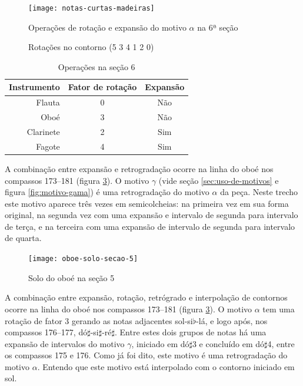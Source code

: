 \begin{figure}
  \centering
    \texttt{[image: notas-curtas-madeiras]}
    \caption{Operações de rotação e expansão do motivo $\alpha$ na 6ª
    seção}
  \label{fig:notas-curtas-madeiras}
\end{figure}

\begin{figure}
  \centering
  \subfloat[Rotação 2: (4 1 2 0 5 3)]{
    \texttt{[image: c-412053]}
    \label{fig:412053}  
  }
  \subfloat[Rotação 3: (1 2 0 5 3 4)]{
    \texttt{[image: c-120534]}
    \label{fig:120534}  
  }
  \caption{Rotações no contorno (5 3 4 1 2 0)}
  \label{fig:rotacoes-534120}
\end{figure}

\begin{table}
  \centering
  \begin{tabular}{r|cc}
    Instrumento & Fator de rotação & Expansão \\
    \hline
    Flauta & 0 & Não \\
    Oboé & 3 & Não \\
    Clarinete & 2 & Sim \\
    Fagote & 4 & Sim \\
  \end{tabular}
  \caption{Operações na seção 6}
  \label{tab:operacoes-secao-6}
\end{table}

A combinação entre expansão e retrogradação ocorre na linha do oboé
nos compassos 173--181 (figura \ref{fig:oboe-solo-secao-5}). O motivo
$\gamma$ (vide seção \ref{sec:uso-de-motivos} e figura
\ref{fig:motivo-gama}) é uma retrogradação do motivo $\alpha$ da
peça. Neste trecho este motivo aparece três vezes em semicolcheias: na
primeira vez em sua forma original, na segunda vez com uma expansão e
intervalo de segunda para intervalo de terça, e na terceira com uma
expansão de intervalo de segunda para intervalo de quarta.

\begin{figure}
  \centering
  \texttt{[image: oboe-solo-secao-5]}
  \caption{Solo do oboé na seção 5}
  \label{fig:oboe-solo-secao-5}
\end{figure}

A combinação entre expansão, rotação, retrógrado e interpolação de
contornos ocorre na linha do oboé nos compassos 173--181 (figura
\ref{fig:oboe-solo-secao-5}). O motivo $\alpha$ tem uma rotação de
fator 3 gerando as notas adjacentes sol-si$\flat$-lá, e logo após, nos
compassos 176--177, dó$\sharp$-si$\sharp$-ré$\sharp$. Entre estes dois
grupos de notas há uma expansão de intervalos do motivo $\gamma$,
iniciado em dó$\sharp$3 e concluído em dó$\sharp$4, entre os compassos
175 e 176. Como já foi dito, este motivo é uma retrogradação do motivo
$\alpha$. Entendo que este motivo está interpolado com o contorno
iniciado em sol.

